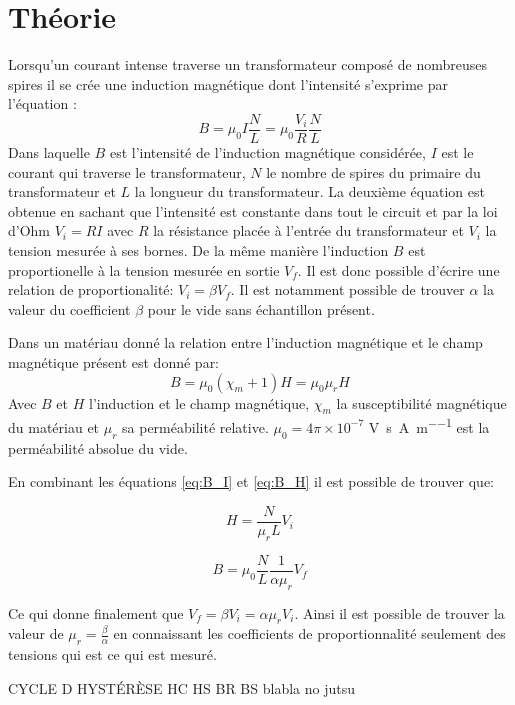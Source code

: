 \section{Théorie}

Lorsqu'un courant intense traverse un transformateur composé de nombreuses spires il se crée une induction magnétique dont l'intensité s'exprime par l'équation \cite{assistant}:
\begin{equation}
    B = \mu_0 I \frac{N}{L} = \mu_0 \frac{V_i}{R} \frac{N}{L}
    \label{eq:B_I}
\end{equation}
Dans laquelle \(B\) est l'intensité de l'induction magnétique considérée, \(I\) est le courant qui traverse le transformateur, \(N\) le nombre de spires du primaire du transformateur et \(L\) la longueur du transformateur. La deuxième équation est obtenue en sachant que l'intensité est constante dans tout le circuit et par la loi d'Ohm \(V_i = RI\) avec \(R\) la résistance placée à l'entrée du transformateur et \(V_i\) la tension mesurée à ses bornes.
De la même manière l'induction \(B\) est proportionelle à la tension mesurée en sortie \(V_f\). Il est donc possible d'écrire une relation de proportionalité: \(V_i = \beta V_f\). Il est notamment possible de trouver \(\alpha\) la valeur du coefficient \(\beta\) pour le vide sans échantillon présent.

Dans un matériau donné la relation entre l'induction magnétique et le champ magnétique présent est donné par:
\begin{equation}
    B = \mu_0 (\chi_m + 1) H = \mu_0 \mu_r H
    \label{eq:B_H}
\end{equation}
Avec \(B\) et \(H\) l'induction et le champ magnétique, \(\chi_m\) la susceptibilité magnétique du matériau et \(\mu_r\) sa perméabilité relative. \(\mu_0 = 4\pi \times 10^{-7}\) \si{\volt\second \per\ampere\per\meter} est la perméabilité absolue du vide.


En combinant les équations \autoref{eq:B_I} et \autoref{eq:B_H} il est possible de trouver que:

\begin{equation}
    H = \frac{N}{\mu_r L} V_i
    \label{eq:calibr_H}
\end{equation}

\begin{equation}
    B = \mu_0 \frac{N}{L} \frac{1}{\alpha \mu_r} V_f
    \label{eq:calibr_B}
\end{equation}

Ce qui donne finalement que \(V_f = \beta V_i = \alpha \mu_r V_i\). Ainsi il est possible de trouver la valeur de \(\mu_r = \frac{\beta}{\alpha}\) en connaissant les coefficients de proportionnalité seulement des tensions qui est ce qui est mesuré.

CYCLE D HYSTÉRÈSE HC HS BR BS blabla no jutsu

